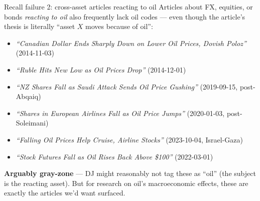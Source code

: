 \documentclass[10pt,aspectratio=169]{beamer}
\begin{document}
\begin{frame}{Recall failure 2: cross-asset articles reacting to oil}
  \scriptsize
  Articles about FX, equities, or bonds \emph{reacting to oil} also
  frequently lack oil codes --- even though the article's thesis is
  literally ``asset $X$ moves because of oil'':

  \smallskip
  \begin{itemize}
    \item \textit{``Canadian Dollar Ends Sharply Down on Lower Oil Prices, Dovish Poloz''} (2014-11-03)
    \item \textit{``Ruble Hits New Low as Oil Prices Drop''} (2014-12-01)
    \item \textit{``NZ Shares Fall as Saudi Attack Sends Oil Price Gushing''} (2019-09-15, post-Abqaiq)
    \item \textit{``Shares in European Airlines Fall as Oil Price Jumps''} (2020-01-03, post-Soleimani)
    \item \textit{``Falling Oil Prices Help Cruise, Airline Stocks''} (2023-10-04, Israel-Gaza)
    \item \textit{``Stock Futures Fall as Oil Rises Back Above \$100''} (2022-03-01)
  \end{itemize}

  \smallskip
  \textbf{Arguably gray-zone} --- DJ might reasonably not tag these as ``oil''
  (the subject is the reacting asset). But for research on oil's
  macroeconomic effects, these are exactly the articles we'd want surfaced.

\end{frame}
\end{document}
